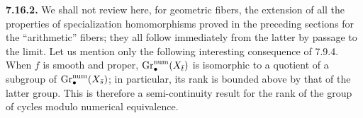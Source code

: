 \textbf{7.16.2.}
We shall not review here, for geometric fibers, the extension of all the
properties of specialization homomorphisms proved in the preceding sections
for the ``arithmetic'' fibers; they all follow immediately from the latter
by passage to the limit. Let us mention only the following interesting
consequence of 7.9.4. When $f$ is smooth and proper,
$\operatorname{Gr}_\bullet^{\mathrm{num}}(X_{\bar t})$ is isomorphic to a quotient of a
subgroup of $\operatorname{Gr}_\bullet^{\mathrm{num}}(X_{\bar s})$; in particular, its
rank is bounded above by that of the latter group. This is therefore a
semi-continuity result for the rank of the group of cycles modulo numerical
equivalence.

